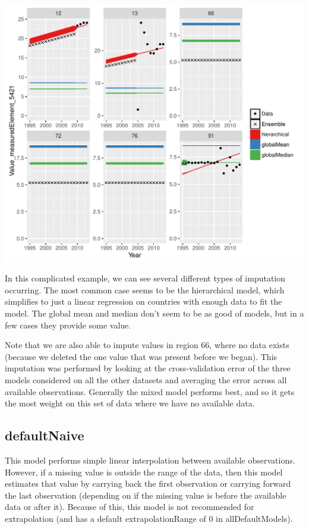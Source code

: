 \documentclass[nojss]{jss}\usepackage[]{graphicx}\usepackage[]{color}
\makeatletter
\def\maxwidth{ %
  \ifdim\Gin@nat@width>\linewidth
    \linewidth
  \else
    \Gin@nat@width
  \fi
}
\newenvironment{knitrout}{}{} %
\makeatother
\begin{document}
\begin{knitrout}
{\centering \includegraphics[width=\maxwidth]{figure/unnamed-chunk-21-1} 

}



\end{knitrout}

In this complicated example, we can see several different types of imputation
occurring.  The most common case seems to be the hierarchical model, which
simplifies to just a linear regression on countries with enough data to fit
the model.  The global mean and median don't seem to be as good of models, but
in a few cases they provide some value.

Note that we are also able to impute values in region 66, where no data exists
(because we deleted the one value that was present before we began).  This
imputation was performed by looking at the cross-validation error of the three
models considered on all the other datasets and averaging the error across all
available observations.  Generally the mixed model performs best, and so it
gets the most weight on this set of data where we have no available data.

\subsection{defaultNaive}

This model performs simple linear interpolation between available observations.
However, if a missing value is outside the range of the data, then this model
estimates that value by carrying back the first observation or carrying forward
the last observation (depending on if the missing value is before the available
data or after it).  Because of this, this model is not recommended for
extrapolation (and has a default extrapolationRange of 0 in allDefaultModels).
\end{document}
